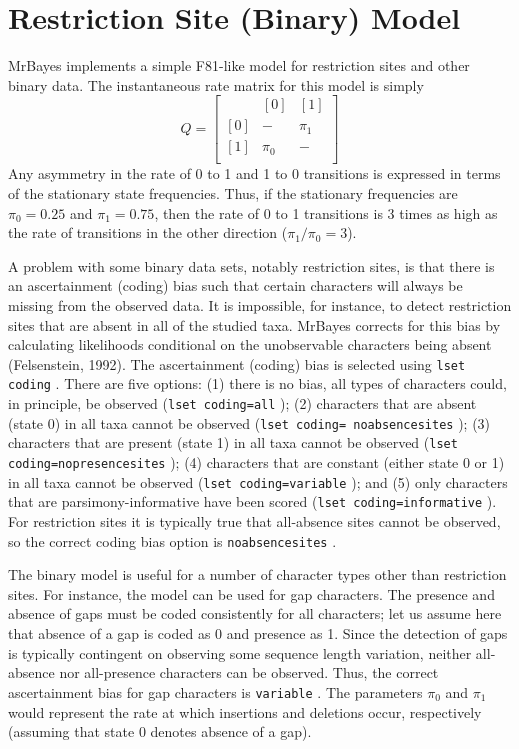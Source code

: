 \documentclass[12pt]{book}
\newcommand{\ttt}[1]{\texttt{#1} }
\begin{document}
\section{Restriction Site (Binary) Model}
MrBayes implements a simple F81-like model for restriction sites and other binary data.
The instantaneous rate matrix for this model is simply
\[
Q=\begin{bmatrix}
    & [0] & [1]\\ 
 [0]& - & \pi_{1}\\ 
 [1]&  \pi_{0}& - \\ 
\end{bmatrix}
\]
Any asymmetry in the rate of 0 to 1 and 1 to 0 transitions is expressed in terms of the
stationary state frequencies. Thus, if the stationary frequencies are $\pi_0 = 0.25$ and $\pi_1 =
0.75$, then the rate of 0 to 1 transitions is 3 times as high as the rate of transitions in the
other direction ($\pi_1 / \pi_0 = 3$).

A problem with some binary data sets, notably restriction sites, is that there is an
ascertainment (coding) bias such that certain characters will always be missing from the
observed data. It is impossible, for instance, to detect restriction sites that are absent in all
of the studied taxa. MrBayes corrects for this bias by calculating likelihoods conditional
on the unobservable characters being absent (Felsenstein, 1992). The ascertainment
(coding) bias is selected using \ttt{lset coding}. There are five options: (1) there is no
bias, all types of characters could, in principle, be observed (\ttt{lset coding=all}); (2)
characters that are absent (state 0) in all taxa cannot be observed (\ttt{lset coding=
noabsencesites}); (3) characters that are present (state 1) in all taxa cannot be
observed (\ttt{lset coding=nopresencesites}); (4) characters that are constant
(either state 0 or 1) in all taxa cannot be observed (\ttt{lset coding=variable}); and
(5) only characters that are parsimony-informative have been scored (\ttt{lset
coding=informative}). For restriction sites it is typically true that all-absence sites
cannot be observed, so the correct coding bias option is \ttt{noabsencesites}.

The binary model is useful for a number of character types other than restriction sites. For
instance, the model can be used for gap characters. The presence and absence of gaps
must be coded consistently for all characters; let us assume here that absence of a gap is
coded as 0 and presence as 1. Since the detection of gaps is typically contingent on
observing some sequence length variation, neither all-absence nor all-presence characters
can be observed. Thus, the correct ascertainment bias for gap characters is \ttt{variable}.
The parameters $\pi_0$ and $\pi_1$ would represent the rate at which insertions and deletions
occur, respectively (assuming that state 0 denotes absence of a gap).
\end{document}
